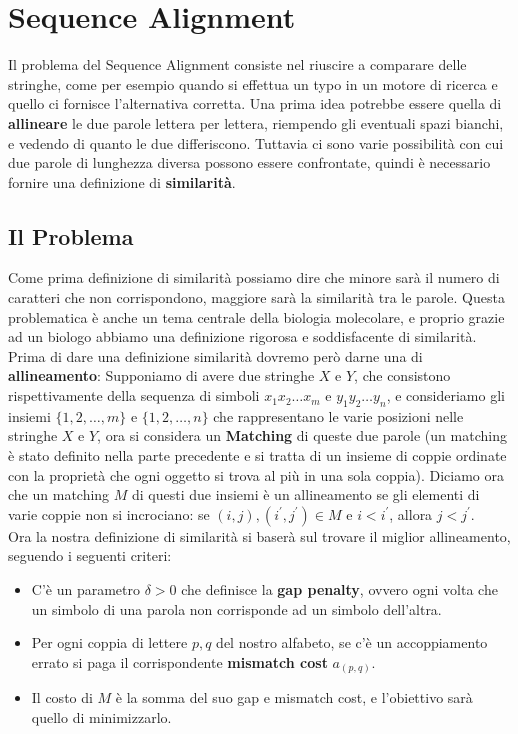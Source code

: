\section{Sequence Alignment}

Il problema del Sequence Alignment consiste nel riuscire a comparare delle
stringhe, come per esempio quando si effettua un typo in un motore di ricerca e
quello ci fornisce l'alternativa corretta. Una prima idea potrebbe essere quella
di \textbf{allineare} le due parole lettera per lettera, riempendo gli eventuali
spazi bianchi, e vedendo di quanto le due differiscono. Tuttavia ci sono varie
possibilità con cui due parole di lunghezza diversa possono essere confrontate,
quindi è necessario fornire una definizione di \textbf{similarità}.

\subsection{Il Problema}

Come prima definizione di similarità possiamo dire che minore sarà il numero di
caratteri che non corrispondono, maggiore sarà la similarità tra le parole.
Questa problematica è anche un tema centrale della biologia molecolare, e
proprio grazie ad un biologo abbiamo una definizione rigorosa e soddisfacente di
similarità. Prima di dare una definizione similarità dovremo però darne una di
\textbf{allineamento}: Supponiamo di avere due stringhe $X$ e $Y$, che consistono rispettivamente
della sequenza di simboli $x_1 x_2 \ldots x_m$ e $y_1 y_2 \ldots y_n$, e
consideriamo gli insiemi $\{1,2,\ldots ,m\}$ e $\{1,2,\ldots ,n\}$ che
rappresentano le varie posizioni nelle stringhe $X$ e $Y$, ora si considera un
\textbf{Matching} di queste due parole (un matching è stato definito nella parte
precedente e si tratta di un insieme di coppie ordinate con la proprietà che
ogni oggetto si trova al più in una sola coppia).  Diciamo ora che un matching
$M$ di questi due insiemi è un allineamento se gli elementi di varie coppie non
si incrociano: se $(i,j),(i^{\prime},j^{\prime}) \in M$  e $i < i^{\prime}$,
allora $j < j^{\prime}$.\\

Ora la nostra definizione di similarità si baserà sul trovare il miglior
allineamento, seguendo i seguenti criteri:

\begin{itemize}
    \item C'è un parametro $\delta>0$ che
          definisce la \textbf{gap penalty}, ovvero ogni volta che un simbolo di una parola
          non corrisponde ad un simbolo dell'altra.
    \item Per ogni coppia di lettere $p,q$ del
          nostro alfabeto, se c'è un accoppiamento errato si paga il corrispondente
          \textbf{mismatch cost} $a_(p,q)$.
    \item Il costo di $M$ è la somma del suo gap e mismatch
          cost, e l'obiettivo sarà quello di minimizzarlo.
\end{itemize}

